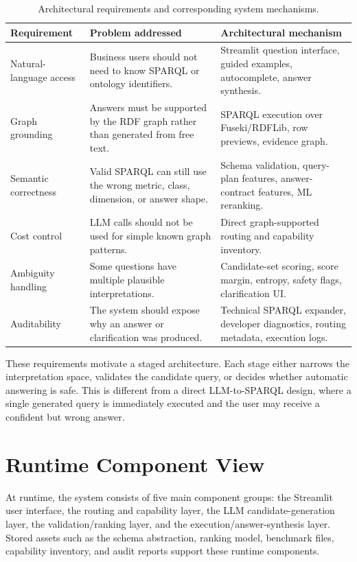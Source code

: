 \documentclass[
  12pt,
  english,
  oneside]{report}
\begin{document}
\begin{table}[htbp]
\centering
\caption{Architectural requirements and corresponding system mechanisms.}
\label{tab:architecture-requirements}
\small
\begin{tabularx}{\textwidth}{
>{\raggedright\arraybackslash}p{3.0cm}
>{\raggedright\arraybackslash}p{5.0cm}
>{\raggedright\arraybackslash}X
}
\toprule
\textbf{Requirement} & \textbf{Problem addressed} & \textbf{Architectural mechanism} \\
\midrule
Natural-language access & Business users should not need to know SPARQL or ontology identifiers. & Streamlit question interface, guided examples, autocomplete, answer synthesis. \\
Graph grounding & Answers must be supported by the RDF graph rather than generated from free text. & SPARQL execution over Fuseki/RDFLib, row previews, evidence graph. \\
Semantic correctness & Valid SPARQL can still use the wrong metric, class, dimension, or answer shape. & Schema validation, query-plan features, answer-contract features, ML reranking. \\
Cost control & LLM calls should not be used for simple known graph patterns. & Direct graph-supported routing and capability inventory. \\
Ambiguity handling & Some questions have multiple plausible interpretations. & Candidate-set scoring, score margin, entropy, safety flags, clarification UI. \\
Auditability & The system should expose why an answer or clarification was produced. & Technical SPARQL expander, developer diagnostics, routing metadata, execution logs. \\
\bottomrule
\end{tabularx}
\end{table}

These requirements motivate a staged architecture. Each stage either narrows the interpretation space, validates the candidate query, or decides whether automatic answering is safe. This is different from a direct LLM-to-SPARQL design, where a single generated query is immediately executed and the user may receive a confident but wrong answer.

\section{Runtime Component View}
\label{sec:runtime-component-view}

At runtime, the system consists of five main component groups: the Streamlit user interface, the routing and capability layer, the LLM candidate-generation layer, the validation/ranking layer, and the execution/answer-synthesis layer. Stored assets such as the schema abstraction, ranking model, benchmark files, capability inventory, and audit reports support these runtime components.
\end{document}
